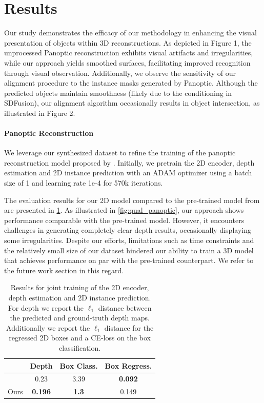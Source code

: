 \section{Results}
\label{sec:results}
Our study demonstrates the efficacy of our methodology in enhancing the visual presentation of objects within 3D reconstructions. As depicted in Figure 1, the unprocessed Panoptic reconstruction exhibits visual artifacts and irregularities, while our approach yields smoothed surfaces, facilitating improved recognition through visual observation. Additionally, we observe the sensitivity of our alignment procedure to the instance masks generated by Panoptic. Although the predicted objects maintain smoothness (likely due to the conditioning in SDFusion), our alignment algorithm occasionally results in object intersection, as illustrated in Figure 2.

\paragraph{Panoptic Reconstruction}

We leverage our synthesized dataset to refine the training of the panoptic reconstruction model proposed by \citet{dahnert2021panoptic}.
Initially, we pretrain the 2D encoder, depth estimation and 2D instance prediction with an ADAM optimizer using a batch size of 1 and learning rate 1e-4 for 570k iterations.

The evaluation results for our 2D model compared to the pre-trained model from \citet{dahnert2021panoptic} are presented in \cref{tab:2dresults}.
As illustrated in \cref{fig:qual_panoptic}, our approach shows performance comparable with the pre-trained model. However, it encounters challenges in generating completely clear depth results, occasionally displaying some irregularities.
Despite our efforts, limitations such as time constraints and the relatively small size of our dataset hindered our ability to train a 3D model that achieves performance on par with the pre-trained counterpart. We refer to the future work section in this regard.
\begin{table}
  \centering
  \begin{tabular}{@{}lccc@{}}
    \toprule
     & Depth & Box Class. & Box Regress. \\
    \midrule
    \citet{dahnert2021panoptic} & 0.23 & 3.39 & \textbf{0.092}\\
    Ours & \textbf{0.196} & \textbf{1.3} & 0.149 \\
    \bottomrule
  \end{tabular}
  \caption{Results for joint training of the 2D encoder, depth estimation and 2D instance prediction. For depth we report the $\ell_1$ distance between the predicted and ground-truth depth maps. Additionally we report the $\ell_1$ distance for the regressed 2D boxes and a CE-loss on the box classification.  }
  \label{tab:2dresults}
\end{table}

